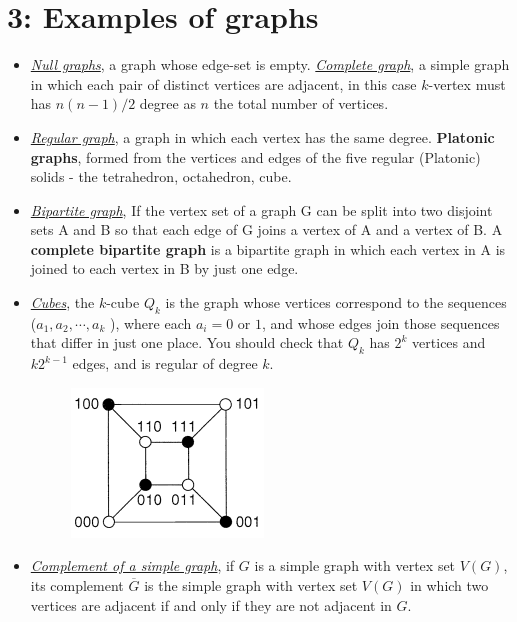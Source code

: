 \documentclass[12pt,a4paper, twocolumn]{article}
\begin{document}
\section*{3: Examples of graphs}
\begin{itemize}
	\item \underline{\emph{\color{magenta} Null graphs}}, a graph whose edge-set is empty. \underline{\emph{\color{magenta} Complete graph}}, a simple graph in which each pair of distinct vertices are adjacent, in this case $k$-vertex must has $n(n-1)/2$ degree as $n$ the total number of vertices.
	\item \underline{\emph{\color{magenta} Regular graph}}, a graph in which each vertex has the same degree. \textbf{Platonic graphs}, formed from the vertices and edges of the five regular (Platonic) solids - the tetrahedron, octahedron, cube.
	\item \underline{\emph{\color{magenta}Bipartite graph}}, If the vertex set of a graph G can be split into two disjoint sets A and B so that each edge of G joins a vertex of A and a vertex of B.  A \textbf{complete bipartite graph} is a bipartite graph in which each vertex in A is joined to each vertex in B by just one edge.
	\item \underline{\emph{\color{magenta} Cubes}}, the $k$-cube $Q_k$ is the graph whose vertices correspond to the sequences ($a_1, a_2, \cdots, a_k$ ), where each $a_i = 0 $ or $1$, and whose edges join those sequences that differ in just one place. You should check that $Q_k$ has $2^{k}$ vertices and $k 2^{k-1}$ edges, and is regular of degree $k$.\\
	\begin{figure}[h!]
	\centering
	\includegraphics[scale=0.7]{figures/cube1.png}
	\end{figure}
	\item \underline{\emph{\color{magenta}Complement of a simple graph}}, if $G$ is a simple graph with vertex set $V(G)$, its complement $\overline{G}$ is the simple graph with vertex set $V(G)$ in which two vertices are adjacent if and only if they are not adjacent in $G$.
\end{itemize}
\end{document}
